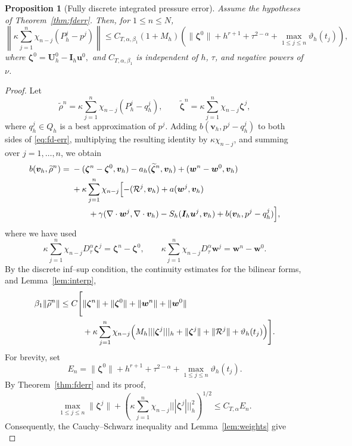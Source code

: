 \documentclass[11pt,a4paper]{article}
\numberwithin{equation}{section}
\theoremstyle{plain}
\newtheorem{proposition}[theorem]{Proposition}
\theoremstyle{definition}
\theoremstyle{remark}
\newcommand{\nrm}[1]{|||#1|||_h}      %
\newcommand{\Dt}{D_\tau^{\alpha}}     %
\begin{document}
\begin{proposition}[Fully discrete integrated pressure error]
\label{prop:fdpressure}
Assume the hypotheses of Theorem~\ref{thm:fderr}.
Then, for $1\le n\le N$,
\[
\left\|
\kappa\sum_{j=1}^n
\chi_{n-j}(P_h^j-p^j)
\right\|\le C_{T,\alpha,\beta_1}
(1+M_h)
\left(
\|\bm\zeta^0\|
+h^{r+1}
+\tau^{2-\alpha}
+\max_{1\le j\le n}\vartheta_h(t_j)
\right),
\]
where
$
\bm\zeta^0=\bm U_h^0-\bm I_h\bm u^0,
$
and $C_{T,\alpha,\beta_1}$ is independent
of $h$, $\tau$, and negative powers of $\nu$.
\end{proposition}


\begin{proof}
Let
\[
\widetilde\rho^n
=
\kappa\sum_{j=1}^n
\chi_{n-j}(P_h^j-q_h^j),
\qquad
\widetilde{\bm\zeta}^n
=
\kappa\sum_{j=1}^n
\chi_{n-j}\bm\zeta^j,
\]
where $q_h^j\in Q_h$ is a best approximation
of $p^j$.
Adding $b(\bm v_h,p^j-q_h^j)$ to both sides
of \eqref{eq:fd-err}, multiplying the resulting
identity by $\kappa\chi_{n-j}$, and summing over
$j=1,\ldots,n$, we obtain
\[
\begin{aligned}
b(\bm v_h,\widetilde\rho^n)
={}&
-(\bm\zeta^n-\bm\zeta^0,\bm v_h)
-a_h(\widetilde{\bm\zeta}^n,\bm v_h)
+(\bm w^n-\bm w^0,\bm v_h)
\\
&+\kappa\sum_{j=1}^n\chi_{n-j}
\Bigl[
-(\mathcal R^j,\bm v_h)
+a(\bm w^j,\bm v_h)
\\
&\qquad+
\gamma(\nabla\cdot\bm w^j,
       \nabla\cdot\bm v_h)
-S_h(\bm I_h\bm u^j,\bm v_h)
+
b(\bm v_h,p^j-q_h^j)
\Bigr],
\end{aligned}
\]
where we have used
\[
\kappa\sum_{j=1}^n
\chi_{n-j}\Dt\bm\zeta^j
=
\bm\zeta^n-\bm\zeta^0,
\qquad
\kappa\sum_{j=1}^n
\chi_{n-j}\Dt\bm w^j
=
\bm w^n-\bm w^0.
\]
%
By the discrete inf--sup condition,
the continuity estimates for the bilinear
forms, and Lemma~\ref{lem:interp},
\[
\begin{aligned}
\beta_1\|\widetilde\rho^n\|
\le C\Bigg[
&\|\bm\zeta^n\|+\|\bm\zeta^0\|
+\|\bm w^n\|+\|\bm w^0\|
\\
&+\kappa\sum_{j=1}^n\chi_{n-j}
\Bigl(
M_h\nrm{\bm\zeta^j}
+\|\bm\zeta^j\|
+\|\mathcal R^j\|
+\vartheta_h(t_j)
\Bigr)
\Bigg].
\end{aligned}
\]
%
For brevity, set
\[
E_n=
\|\bm\zeta^0\|
+h^{r+1}
+\tau^{2-\alpha}
+\max_{1\le j\le n}\vartheta_h(t_j).
\]
By Theorem~\ref{thm:fderr} and its proof,
\[
\max_{1\le j\le n}\|\bm\zeta^j\|
+
\left(
\kappa\sum_{j=1}^n
\chi_{n-j}\nrm{\bm\zeta^j}^2
\right)^{1/2}
\le C_{T,\alpha}E_n.
\]
Consequently, the Cauchy--Schwarz inequality
and Lemma~\ref{lem:weights} give
\[
\]
\end{proof}
\end{document}
